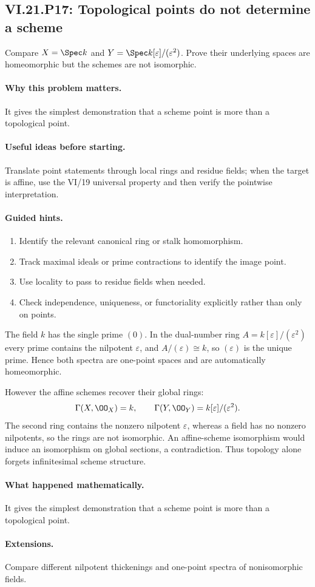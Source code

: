 \subsection*{VI.21.P17: Topological points do not determine a scheme}
\begin{problem}\label{prob:vi21-p17}
Compare $X=\Spec k$ and $Y=\Spec k[\varepsilon]/(\varepsilon^2)$.  Prove their underlying spaces are homeomorphic but the schemes are not isomorphic.
\end{problem}

\ifdefined\FullProblemDossiers
\paragraph{Why this problem matters.}
It gives the simplest demonstration that a scheme point is more than a topological point.

\paragraph{Useful ideas before starting.}
Translate point statements through local rings and residue fields; when the target is affine, use the VI/19 universal property and then verify the pointwise interpretation.

\paragraph{Guided hints.}
\begin{enumerate}
\item Identify the relevant canonical ring or stalk homomorphism.
\item Track maximal ideals or prime contractions to identify the image point.
\item Use locality to pass to residue fields when needed.
\item Check independence, uniqueness, or functoriality explicitly rather than only on points.
\end{enumerate}

\begin{solution}
The field $k$ has the single prime $(0)$.  In the dual-number ring
$A=k[\varepsilon]/(\varepsilon^2)$ every prime contains the nilpotent $\varepsilon$, and
$A/(\varepsilon)\cong k$, so $(\varepsilon)$ is the unique prime.  Hence both spectra are one-point
spaces and are automatically homeomorphic.

However the affine schemes recover their global rings:
\[
\Gamma(X,\OO_X)=k,
\qquad
\Gamma(Y,\OO_Y)=k[\varepsilon]/(\varepsilon^2).
\]
The second ring contains the nonzero nilpotent $\varepsilon$, whereas a field has no nonzero
nilpotents, so the rings are not isomorphic.  An affine-scheme isomorphism would induce an
isomorphism on global sections, a contradiction.  Thus topology alone forgets infinitesimal
scheme structure.
\end{solution}

\paragraph{What happened mathematically.}
It gives the simplest demonstration that a scheme point is more than a topological point.

\paragraph{Extensions.}
Compare different nilpotent thickenings and one-point spectra of nonisomorphic fields.
\fi
